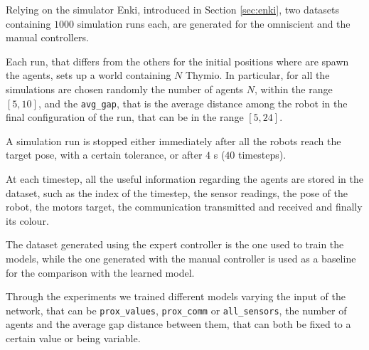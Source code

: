 Relying on the simulator Enki, introduced in Section \ref{sec:enki}, two datasets 
containing $1000$ simulation runs each, are generated for the omniscient and 
the manual controllers. 

Each run, that differs from the others for the initial positions where are spawn the 
agents, sets up a world containing $N$ Thymio. 
In particular, for all the simulations are chosen randomly the number of agents 
$N$, within the range $[5, 10]$, and the \texttt{avg\_gap}, that is the average 
distance among the robot in the final configuration of the run, that can be in the 
range $[5, 24]$.

A simulation run is stopped either immediately after all the robots reach the 
target pose, with a certain tolerance, or after $4$ \gls{s} ($40$ timesteps).

At each timestep, all the useful information regarding the agents are stored in the 
dataset, such as the index of the timestep, the sensor readings, the pose of the 
robot, the motors target, the communication transmitted and received and finally 
its colour.

The dataset generated using the expert controller is the one used to train the 
models, while the one generated with the manual controller is used as a baseline 
for the comparison with the learned model.

Through the experiments we trained different models varying the input of the 
network, that can be \texttt{prox\_values}, \texttt{prox\_comm} or 
\texttt{all\_sensors}, the number of agents and the average gap distance between 
them, that can both be fixed to a certain value or being variable.



